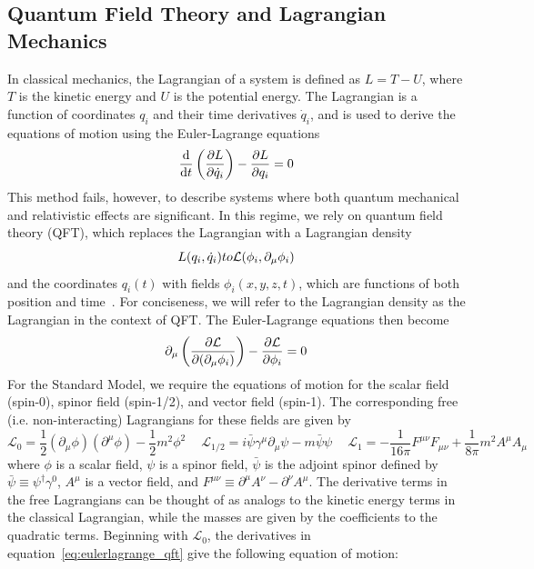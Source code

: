 \subsection{Quantum Field Theory and Lagrangian Mechanics} \label{sec:sm_theory_qft}
In classical mechanics, the Lagrangian of a system is defined as $L=T-U$, where $T$ is the kinetic energy and $U$ is the potential energy. The Lagrangian is a function of coordinates $q_i$ and their time derivatives $\dot{q}_i$, and is used to derive the equations of motion using the Euler-Lagrange equations
\begin{equation}
	\label{eq:eulerlagrange_cm}
	\dv{}{t}\left(\pdv{L}{\dot{q}_i}\right)-\pdv{L}{q_i}=0
\end{equation}
This method fails, however, to describe systems where both quantum mechanical and relativistic effects are significant. In this regime, we rely on quantum field theory (QFT), which replaces the Lagrangian with a Lagrangian density
\begin{equation}
		L(q_i,\dot{q}_i)\to\mathcal{L}(\phi_i,\partial_\mu\phi_i)\\
\end{equation}
and the coordinates $q_i(t)$ with fields $\phi_i(x,y,z,t)$, which are functions of both position and time~\cite{Thomson_2013}. For conciseness, we will refer to the Lagrangian density as the Lagrangian in the context of QFT. The Euler-Lagrange equations then become
\begin{equation}
	\label{eq:eulerlagrange_qft}
	\partial_\mu\left(\pdv{\mathcal{L}}{(\partial_\mu\phi_i)}\right)-\pdv{\mathcal{L}}{\phi_i}=0
\end{equation}
For the Standard Model, we require the equations of motion for the scalar field (spin-0), spinor field (spin-1/2), and vector field (spin-1). The corresponding free (i.e. non-interacting) Lagrangians for these fields are given by
\begin{equation}\label{eq:lagrangians}
	\mathcal{L}_0=\frac{1}{2}\left(\partial_\mu\phi\right)\left(\partial^\mu\phi\right)-\frac{1}{2}m^2\phi^2\quad \ 
	\mathcal{L}_{1/2}=i\bar{\psi}\gamma^\mu\partial_\mu\psi-m\bar{\psi}\psi \quad \ 
	\mathcal{L}_{1}=-\frac{1}{16\pi}F^{\mu\nu}F_{\mu\nu}+\frac{1}{8\pi}m^2A^\mu A_\mu
\end{equation}
where $\phi$ is a scalar field, $\psi$ is a spinor field, $\bar{\psi}$ is the adjoint spinor defined by $\bar{\psi}\equiv\psi^\dagger\gamma^0$, $A^\mu$ is a vector field, and $F^{\mu\nu}\equiv\partial^\mu A^\nu-\partial^\nu A^\mu$. The derivative terms in the free Lagrangians can be thought of as analogs to the kinetic energy terms in the classical Lagrangian, while the masses are given by the coefficients to the quadratic terms. Beginning with $\mathcal{L}_0$, the derivatives in equation~\ref{eq:eulerlagrange_qft} give the following equation of motion:
